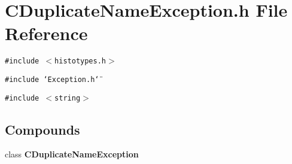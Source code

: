 \section{CDuplicate\-Name\-Exception.h File Reference}
\label{CDuplicateNameException_8h}
{\tt \#include $<$histotypes.h$>$}\par
{\tt \#include \char`\"{}Exception.h\char`\"{}}\par
{\tt \#include $<$string$>$}\par
\subsection*{Compounds}
\begin{CompactItemize}
\item 
class {\bf CDuplicate\-Name\-Exception}
\end{CompactItemize}
